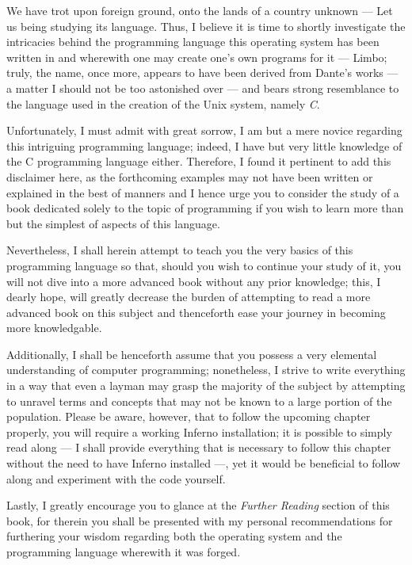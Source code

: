 \documentclass[a5paper,twoside,12pt]{report}
\begin{document}
We have trot upon foreign ground, onto the lands of a country unknown — Let us being studying its language. Thus, I believe it is time to shortly investigate the intricacies behind the programming language this operating system has been written in and wherewith one may create one's own programs for it — Limbo; truly, the name, once more, appears to have been derived from Dante's works — a matter I should not be too astonished over — and bears strong resemblance to the language used in the creation of the Unix system, namely \textit{C}. 

Unfortunately, I must admit with great sorrow, I am but a mere novice regarding this intriguing programming language; indeed, I have but very little knowledge of the C programming language either. Therefore, I found it pertinent to add this disclaimer here, as the forthcoming examples may not have been written or explained in the best of manners and I hence urge you to consider the study of a book dedicated solely to the topic of programming if you wish to learn more than but the simplest of aspects of this language.

Nevertheless, I shall herein attempt to teach you the very basics of this programming language so that, should you wish to continue your study of it, you will not dive into a more advanced book without any prior knowledge; this, I dearly hope, will greatly decrease the burden of attempting to read a more advanced book on this subject and thenceforth ease your journey in becoming more knowledgable.

Additionally, I shall be henceforth assume that you possess a very elemental understanding of computer programming; nonetheless, I strive to write everything in a way that even a layman may grasp the majority of the subject by attempting to unravel terms and concepts that may not be known to a large portion of the population. Please be aware, however, that to follow the upcoming chapter properly, you will require a working Inferno installation; it is possible to simply read along — I shall provide everything that is necessary to follow this chapter without the need to have Inferno installed —, yet it would be beneficial to follow along and experiment with the code yourself.

Lastly, I greatly encourage you to glance at the \textit{Further Reading} section of this book, for therein you shall be presented with my personal recommendations for furthering your wisdom regarding both the operating system and the programming language wherewith it was forged.
\end{document}
